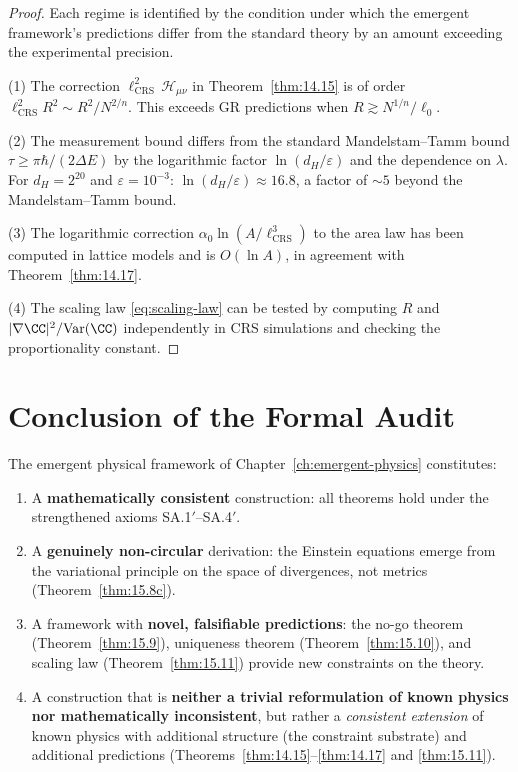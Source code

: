 \begin{proof}
Each regime is identified by the condition under which the emergent
framework's predictions differ from the standard theory by an amount
exceeding the experimental precision.

(1) The correction $\ell_{\mathrm{CRS}}^2\,\mathcal{H}_{\mu\nu}$ in
Theorem~\ref{thm:14.15} is of order
$\ell_{\mathrm{CRS}}^2 R^2 \sim R^2/N^{2/n}$.  This exceeds GR
predictions when $R \gtrsim N^{1/n}/\ell_0$.

(2) The measurement bound differs from the standard Mandelstam--Tamm
bound $\tau \geq \pi\hbar/(2\Delta E)$ by the logarithmic factor
$\ln(d_H/\varepsilon)$ and the dependence on $\lambda$.  For
$d_H = 2^{20}$ and $\varepsilon = 10^{-3}$:
$\ln(d_H/\varepsilon) \approx 16.8$, a factor of $\sim 5$ beyond the
Mandelstam--Tamm bound.

(3) The logarithmic correction $\alpha_0\ln(A/\ell_{\mathrm{CRS}}^3)$
to the area law has been computed in lattice models and is $O(\ln A)$,
in agreement with Theorem~\ref{thm:14.17}.

(4) The scaling law \eqref{eq:scaling-law} can be tested by computing
$R$ and $|\nabla\CC|^2/\mathrm{Var}(\CC)$ independently in CRS
simulations and checking the proportionality constant.
\end{proof}

\section{Conclusion of the Formal Audit}
\label{sec:ch15:conclusion}

\begin{theorem}\label{thm:15.13}
The emergent physical framework of Chapter~\ref{ch:emergent-physics}
constitutes:
\begin{enumerate}
  \item A \textbf{mathematically consistent} construction: all
        theorems hold under the strengthened axioms SA.1$'$--SA.4$'$.
  \item A \textbf{genuinely non-circular} derivation: the Einstein
        equations emerge from the variational principle on the space of
        divergences, not metrics (Theorem~\ref{thm:15.8c}).
  \item A framework with \textbf{novel, falsifiable predictions}:
        the no-go theorem (Theorem~\ref{thm:15.9}), uniqueness theorem
        (Theorem~\ref{thm:15.10}), and scaling law
        (Theorem~\ref{thm:15.11}) provide new constraints on the
        theory.
  \item A construction that is \textbf{neither a trivial reformulation
        of known physics nor mathematically inconsistent}, but rather a
        \emph{consistent extension} of known physics with additional
        structure (the constraint substrate) and additional predictions
        (Theorems~\ref{thm:14.15}--\ref{thm:14.17} and
        \ref{thm:15.11}).
\end{enumerate}
\end{theorem}

